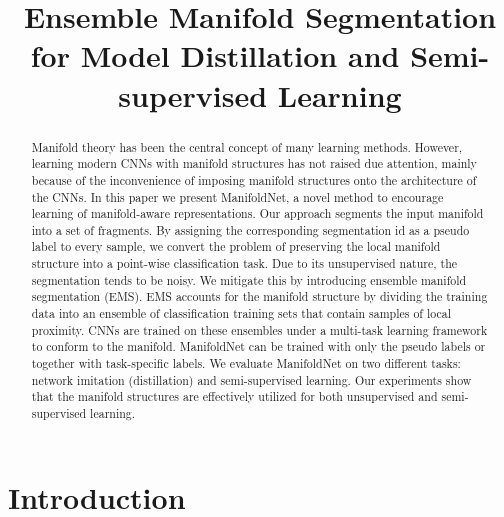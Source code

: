 \documentclass{bmvc2k}
\title{Ensemble Manifold Segmentation for Model Distillation and Semi-supervised Learning}
\begin{document}
\maketitle
\begin{abstract}

Manifold theory has been the central concept of many learning methods. However, learning modern CNNs with manifold structures has not raised due attention, mainly because of the inconvenience of imposing manifold structures onto the architecture of the CNNs.  
In this paper we present ManifoldNet, a novel method to  encourage learning of manifold-aware representations. Our approach segments the input manifold into a set of fragments. By assigning the corresponding segmentation id as a pseudo label to every sample, we convert the problem of preserving the local manifold structure into a point-wise classification task.
Due to its unsupervised nature, the segmentation tends to be noisy. We mitigate this by introducing ensemble manifold segmentation (EMS). EMS accounts for the manifold structure by dividing the training data into an ensemble of classification training sets that contain samples of local proximity. CNNs are trained on these ensembles under a multi-task learning framework to conform to the manifold. ManifoldNet can be trained with only the pseudo labels or together with task-specific labels.  
We evaluate ManifoldNet on two different tasks: network imitation (distillation) and semi-supervised learning. Our experiments show that the manifold structures are effectively utilized for both unsupervised and semi-supervised learning. 
\end{abstract}

\section{Introduction}
\label{sec:intro}
\end{document}
